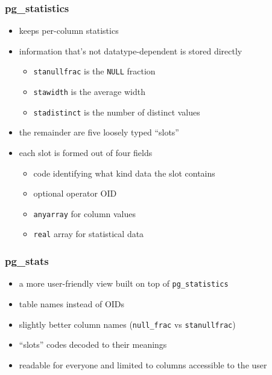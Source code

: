 \documentclass{beamer}
\begin{document}
\begin{frame}
  \frametitle{pg\_statistics}

  \begin{itemize}
  \item keeps \alert{per-column} statistics
  \item information that's not \alert{datatype-dependent} is stored directly
    \begin{itemize}
    \item \texttt{stanullfrac} is the \texttt{NULL} fraction
    \item \texttt{stawidth} is the average width
    \item \texttt{stadistinct} is the number of distinct values
    \end{itemize}
  \item the remainder are five \alert{loosely typed} ``slots''
  \item each slot is formed out of \alert{four fields}
    \begin{itemize}
    \item \alert{code} identifying what kind data the slot contains
    \item optional \alert{operator OID}
    \item \texttt{anyarray} for \alert{column values}
    \item \texttt{real} array for \alert{statistical data}
    \end{itemize}
  \end{itemize}
\end{frame}

\begin{frame}
  \frametitle{pg\_stats}

  \begin{itemize}
  \item a more \alert{user-friendly} view built on top of \texttt{pg\_statistics}
  \item \alert{table names} instead of OIDs
  \item slightly better \alert{column names} (\texttt{null\_frac} vs \texttt{stanullfrac})
  \item ``slots'' codes \alert{decoded} to their meanings
  \item \alert{readable for everyone} and limited to columns accessible to the user
  \end{itemize}
\end{frame}

\end{document}

